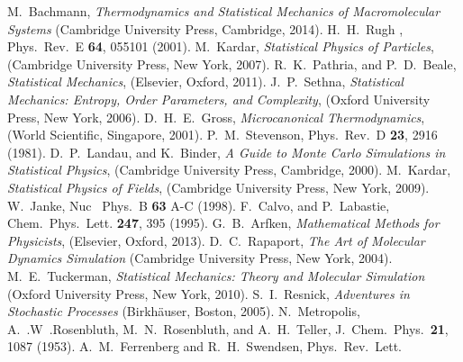 %
M.~Bachmann, \emph{Thermodynamics and Statistical Mechanics of
Macromolecular Systems}  (Cambridge University Press, Cambridge,
2014).
%
H.~H.~Rugh , Phys.\ Rev.~E \textbf{64},
055101 (2001).
%
%
M.~Kardar, \emph{Statistical Physics of Particles}, (Cambridge University Press, New York, 2007).
%
R.~K.~Pathria, and P.~D.~Beale, \emph{Statistical Mechanics}, (Elsevier, Oxford, 2011).
%
J.~P.~Sethna, \emph{Statistical Mechanics: Entropy, Order Parameters, and Complexity}, 
(Oxford University Press, New York, 2006).
%
%
D.~H.~E.~Gross, \emph{Microcanonical Thermodynamics}, (World Scientific, Singapore,  2001).
%
P.~M.~Stevenson, Phys.\ Rev.~D \textbf{23}, 2916 (1981).
%
%
D.~P.\ Landau, and K.~Binder, \emph{A Guide to Monte Carlo Simulations in Statistical Physics}, (Cambridge University Press, Cambridge, 2000).
%
M.~Kardar, \emph{Statistical Physics of Fields}, (Cambridge University Press, New York, 2009).
%
W.~Janke, Nuc \ Phys.~B \textbf{63} A-C (1998).
%
F.~Calvo, and P.~Labastie,  Chem.\ Phys.\ Lett. \textbf{247}, 395 (1995).
%
G.~B.~Arfken, \emph{Mathematical Methods for Physicists},  (Elsevier, Oxford, 2013).
%
%
D.~C.~Rapaport,  \emph{The Art of Molecular Dynamics Simulation}  (Cambridge University Press, New York,
2004).
M.~E.~Tuckerman, \emph{Statistical Mechanics: Theory and Molecular Simulation} (Oxford University Press, New York, 2010).
%
%
S.~I.~Resnick, \emph{Adventures in Stochastic Processes} (Birkh{\"a}user, Boston, 2005).
%
%
N.~Metropolis, A.~.W~.Rosenbluth, M.~N.~Rosenbluth, and A.~H.~Teller,   J.~Chem.\ Phys.\
\textbf{21}, 1087 (1953).
%
%
A.~M.\ Ferrenberg and R.~H.\ Swendsen, Phys.\ Rev.\ Lett.\
